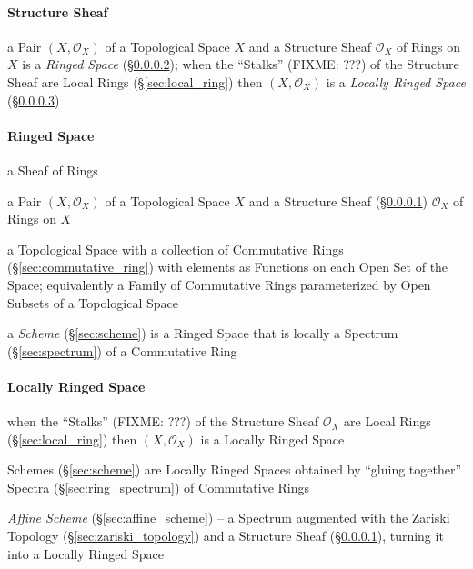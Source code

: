 \paragraph{Structure Sheaf}\label{sec:structure_sheaf}\hfill

a Pair $(X,\mathcal{O}_X)$ of a Topological Space $X$ and a Structure Sheaf
$\mathcal{O}_X$ of Rings on $X$ is a \emph{Ringed Space}
(\S\ref{sec:ringed_space});
when the ``Stalks'' (FIXME: ???) of the Structure Sheaf are Local Rings
(\S\ref{sec:local_ring}) then $(X,\mathcal{O}_X)$ is a \emph{Locally Ringed
  Space} (\S\ref{sec:locally_ringed_space})



\paragraph{Ringed Space}\label{sec:ringed_space}\hfill

a Sheaf of Rings

a Pair $(X,\mathcal{O}_X)$ of a Topological Space $X$ and a Structure Sheaf
(\S\ref{sec:structure_sheaf}) $\mathcal{O}_X$ of Rings on $X$

a Topological Space with a collection of Commutative Rings
(\S\ref{sec:commutative_ring}) with elements as Functions on each Open Set of
the Space; equivalently a Family of Commutative Rings parameterized by Open
Subsets of a Topological Space

a \emph{Scheme} (\S\ref{sec:scheme}) is a Ringed Space that is locally a
Spectrum (\S\ref{sec:spectrum}) of a Commutative Ring



\paragraph{Locally Ringed Space}\label{sec:locally_ringed_space}\hfill

when the ``Stalks'' (FIXME: ???) of the Structure Sheaf $\mathcal{O}_X$ are
Local Rings (\S\ref{sec:local_ring}) then $(X,\mathcal{O}_X)$ is a Locally
Ringed Space

\fist Schemes (\S\ref{sec:scheme}) are Locally Ringed Spaces obtained by
``gluing together'' Spectra (\S\ref{sec:ring_spectrum}) of Commutative Rings

\fist \emph{Affine Scheme} (\S\ref{sec:affine_scheme}) -- a Spectrum augmented
with the Zariski Topology (\S\ref{sec:zariski_topology}) and a Structure Sheaf
(\S\ref{sec:structure_sheaf}), turning it into a Locally Ringed Space



